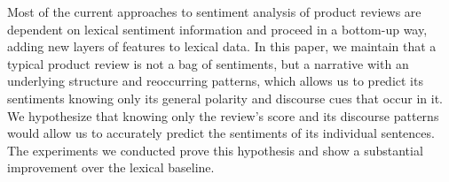 Most of the current approaches to sentiment analysis of product reviews are dependent on lexical sentiment information and proceed in a bottom-up way, adding new layers of features to lexical data. In this paper, we maintain that a typical product review is not a bag of sentiments, but a narrative with an underlying structure and reoccurring patterns, which allows us to predict its sentiments knowing only its general polarity and discourse cues that occur in it. We hypothesize that knowing only the review's score and its discourse patterns would allow us to accurately predict the sentiments of its individual sentences. The experiments we conducted prove this hypothesis and show a substantial improvement over the lexical baseline.
